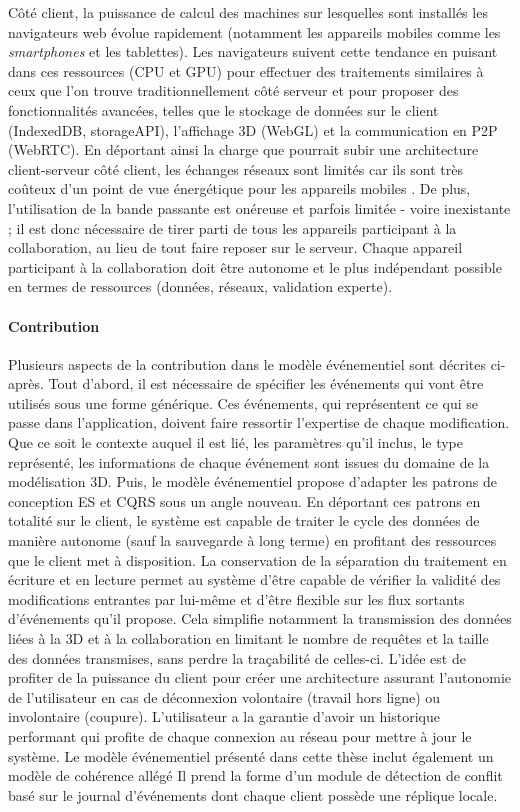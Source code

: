 Côté client, la puissance de calcul des machines sur lesquelles sont installés les 
navigateurs web évolue rapidement (notamment les appareils mobiles comme les 
\textit{smartphones} et les tablettes). Les navigateurs suivent cette tendance en 
puisant dans ces ressources (CPU et GPU) pour effectuer des traitements similaires à ceux que 
l'on trouve traditionnellement côté serveur et pour proposer des fonctionnalités 
avancées, telles que le stockage de données sur le client (IndexedDB, 
storageAPI), l'affichage \gls{3D} (WebGL) et la communication en 
\gls{P2P} 
(\gls{WebRTC}). En déportant ainsi la charge que pourrait subir une architecture 
client-serveur côté client, les échanges réseaux sont limités car ils 
sont très coûteux d'un point de vue énergétique pour les appareils mobiles 
\cite{Koskela2015}. De plus, l'utilisation de la bande passante est onéreuse et 
parfois limitée - voire inexistante ; il est donc nécessaire de tirer parti de tous les 
appareils participant à la collaboration, au lieu de tout faire reposer sur le serveur. 
Chaque appareil participant à la collaboration doit être autonome et le plus 
indépendant possible en termes de ressources (données, réseaux, validation 
experte). 

\paragraph{Contribution}
Plusieurs aspects de la contribution dans le modèle événementiel sont décrites ci-après. 
Tout d'abord, il est nécessaire de spécifier les événements qui vont être utilisés
sous une forme générique. Ces événements, qui représentent ce qui se passe dans l'application, 
doivent faire ressortir l'expertise de chaque modification. Que ce soit le contexte 
auquel il est lié, les paramètres qu'il inclus, le type représenté, les informations de chaque événement
sont issues du domaine de la modélisation 3D. 
Puis, le modèle événementiel propose d'adapter les patrons de conception 
\gls{ES} et \gls{CQRS} sous un angle nouveau.
En déportant ces patrons en totalité sur le client, le système est capable de traiter 
le cycle des données de manière autonome (sauf la sauvegarde à long terme) en profitant des
ressources que le client met à disposition. La conservation de la séparation du traitement 
en écriture et en lecture permet au système d'être capable de vérifier la validité des 
modifications entrantes par lui-même et d'être flexible sur les flux sortants d'événements qu'il propose.
Cela simplifie notamment la transmission des données liées à la \gls{3D} et à la collaboration en limitant le 
nombre de requêtes et la taille des données transmises, sans perdre la traçabilité de 
celles-ci. L'idée est de profiter de la puissance du client pour créer une 
architecture assurant l'autonomie de l'utilisateur en cas de déconnexion volontaire 
(travail hors ligne) ou involontaire (coupure). L'utilisateur a la garantie d'avoir 
un historique performant qui profite de chaque connexion au réseau  pour mettre à jour le système.
Le modèle événementiel présenté dans cette thèse inclut également un modèle de cohérence allégé 
Il prend la forme d'un module de détection de conflit basé sur le journal d'événements dont chaque 
client possède une réplique locale.

